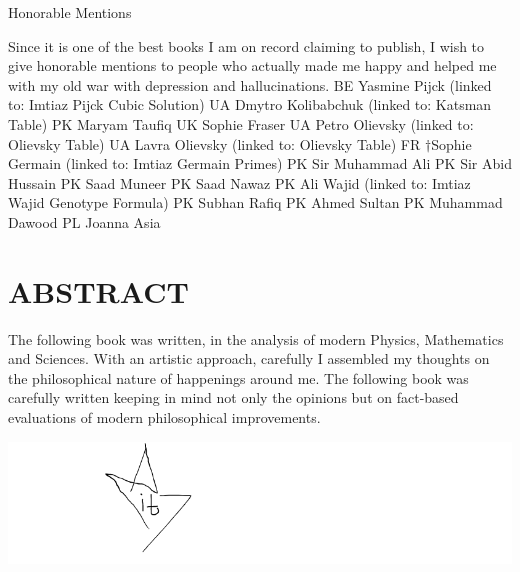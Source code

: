 \documentclass[a4paper,12pt]{book}[2004/02/16]
\theoremstyle{ilemma}
\theoremstyle{itheorem}
\theoremstyle{iother}
\theoremstyle{icorollary}
\theoremstyle{numcorollary}
\theoremstyle{idefinition}
\begin{document}
\newpage
\Huge
\begin{center}
Honorable Mentions  
\end{center}
\normalsize
Since it is one of the best books I am on record claiming to publish, I wish to give honorable mentions to people who actually made me happy and helped me with my old war with depression and hallucinations.
\newline
\newline
BE Yasmine Pijck  (linked to: Imtiaz Pijck Cubic Solution)
\newline
UA Dmytro Kolibabchuk (linked to: Katsman Table)
\newline
PK Maryam Taufiq
\newline
UK Sophie Fraser
\newline
UA Petro Olievsky (linked to: Olievsky Table)
\newline
UA Lavra Olievsky (linked to: Olievsky Table)
\newline
FR $\dagger$Sophie Germain (linked to: Imtiaz Germain Primes)
\newline
PK Sir Muhammad Ali
\newline
PK Sir Abid Hussain
\newline
PK Saad Muneer
\newline
PK Saad Nawaz
\newline
PK Ali Wajid (linked to: Imtiaz Wajid Genotype Formula)
\newline
PK Subhan Rafiq
\newline
PK Ahmed Sultan
\newline
PK Muhammad Dawood
\newline
PL Joanna Asia

\chapter*{ABSTRACT}
The following book was written, in the analysis of modern Physics, Mathematics and Sciences. With an artistic approach, carefully I assembled my thoughts on the philosophical nature of happenings around me. The following book was carefully written keeping in mind not only the opinions but on fact-based evaluations of modern philosophical improvements.

\bigskip
[signed]

\includegraphics[]{signature.png}
\end{document}

